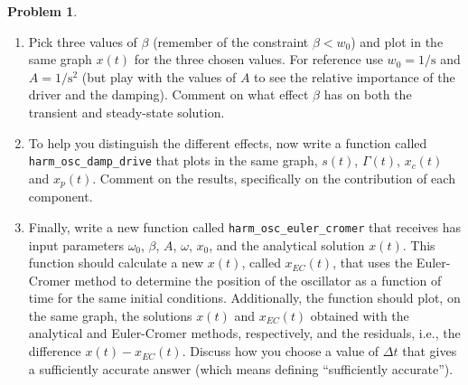\documentclass[10pt]{article}
\theoremstyle{definition}
\newtheorem{problem}{Problem}
\begin{document}
\begin{problem}
\begin{enumerate}[label=(\alph*)]
      \item Pick three values of $\beta$ (remember of the constraint $\beta<w_0$) and plot in the same graph $x(t)$ for the three
            chosen values. For reference use $w_0=1\unit{\per\second}$ and $A=1\unit{\per\second\squared}$ (but play with the values of $A$ to see the relative
            importance of the driver and the damping). Comment on what effect $\beta$ has on both the transient and steady-state solution.

      \item To help you distinguish the different effects, now write a function called \verb|harm_osc_damp_drive| that plots
            in the same graph, $s(t)$, $\Gamma(t)$, $x_c(t)$ and $x_p(t)$. Comment on the results, specifically on the contribution of each component.

      \item Finally, write a new function called \verb|harm_osc_euler_cromer| that receives has input parameters $\omega_0$, $\beta$,
            $A$, $\omega$, $x_0$, and the analytical solution $x(t)$. This function should calculate a new $x(t)$, called $x_{EC}(t)$, that uses
            the Euler-Cromer method to determine the position of the oscillator as a function of time for the same initial conditions. Additionally, the function should
            plot, on the same graph, the solutions $x(t)$ and $x_{EC}(t)$ obtained with the analytical and Euler-Cromer methods, respectively, and the residuals, i.e.,
            the difference $x(t)-x_{EC}(t)$. Discuss how you choose a value of $\Delta t$ that gives a sufficiently accurate answer (which means defining
            ``sufficiently accurate'').
\end{enumerate}
\end{problem}
\end{document}
